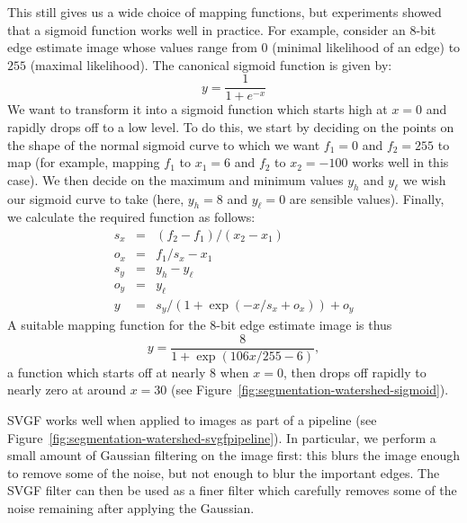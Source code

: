 This still gives us a wide choice of mapping functions, but experiments showed that a sigmoid function works well in practice. For example, consider an 8-bit edge estimate image whose values range from $0$ (minimal likelihood of an edge) to $255$ (maximal likelihood). The canonical sigmoid function is given by:
%
\[
y = \frac{1}{1 + e^{-x}}
\]
%
We want to transform it into a sigmoid function which starts high at $x = 0$ and rapidly drops off to a low level. To do this, we start by deciding on the points on the shape of the normal sigmoid curve to which we want $f_1 = 0$ and $f_2 = 255$ to map (for example, mapping $f_1$ to $x_1 = 6$ and $f_2$ to $x_2 = -100$ works well in this case). We then decide on the maximum and minimum values $y_h$ and $y_\ell$ we wish our sigmoid curve to take (here, $y_h = 8$ and $y_\ell = 0$ are sensible values). Finally, we calculate the required function as follows:
%
\begin{eqnarray*}
s_x & = & (f_2 - f_1)/(x_2 - x_1) \\
o_x & = & f_1/s_x - x_1 \\
s_y & = & y_h - y_\ell \\
o_y & = & y_\ell \\
y & = & s_y/(1 + \exp(-x/s_x + o_x)) + o_y
\end{eqnarray*}
%
A suitable mapping function for the 8-bit edge estimate image is thus
%
\[
y = \frac{8}{1 + \exp(106x/255 - 6)},
\]
%
a function which starts off at nearly $8$ when $x = 0$, then drops off rapidly to nearly zero at around $x = 30$ (see Figure~\ref{fig:segmentation-watershed-sigmoid}).


SVGF works well when applied to images as part of a pipeline (see Figure~\ref{fig:segmentation-watershed-svgfpipeline}). In particular, we perform a small amount of Gaussian filtering on the image first: this blurs the image enough to remove some of the noise, but not enough to blur the important edges. The SVGF filter can then be used as a finer filter which carefully removes some of the noise remaining after applying the Gaussian.


